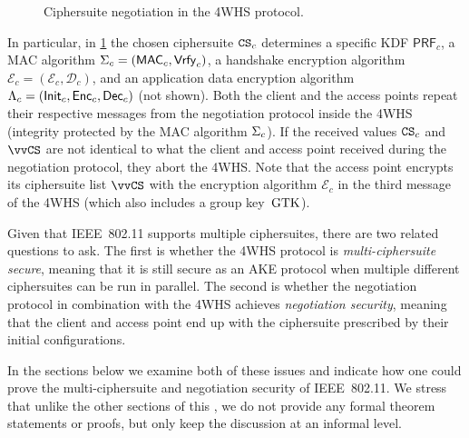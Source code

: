 \begin{figure}
	\centering
	
	
	
	\caption{Ciphersuite negotiation in the 4WHS protocol.}
	\label{fig:4WHS_negotiation}
\end{figure}

In particular,
in \cref{fig:4WHS_negotiation} the chosen ciphersuite $\mathtt{CS}_c$ determines a specific KDF $\mathsf{PRF}_c$,
a MAC algorithm $\Sigma_c = (\mathsf{MAC}_c, \mathsf{Vrfy}_c)$,
a handshake encryption algorithm $\mathcal{E}_c = (\mathcal{E}_c, \mathcal{D}_c)$,
and an application data encryption algorithm $\Lambda_c = (\mathsf{Init}_c, \mathsf{Enc}_c, \mathsf{Dec}_c)$ (not shown). 
Both the client and the access points repeat their respective messages from the negotiation protocol inside the 4WHS
(integrity protected by the MAC algorithm $\Sigma_c$).
If the received values $\mathtt{CS}_c$ and $\vcnf$ are not identical to what the client and access point received during the negotiation protocol,
they abort the 4WHS.
Note that the access point encrypts its ciphersuite list $\vcnf$ with the encryption algorithm $\mathcal{E}_c$ in the third message of the 4WHS
(which also includes a group key~$\mathrm{GTK}$). 

Given that IEEE~802.11 supports multiple ciphersuites,
there are two related questions to ask.
The first is whether the 4WHS protocol is \emph{multi-ciphersuite secure},
meaning that it is still secure as an AKE protocol when multiple different ciphersuites can be run in parallel.
The second is whether the negotiation protocol in combination with the 4WHS achieves \emph{negotiation security},
meaning that the client and access point end up with the ciphersuite prescribed by their initial configurations.

In the sections below we examine both of these issues and indicate how one could prove the multi-ciphersuite and negotiation security of IEEE~802.11.
We stress that unlike the other sections of this ,
we do not provide any formal theorem statements or proofs,
but only keep the discussion at an informal level.









